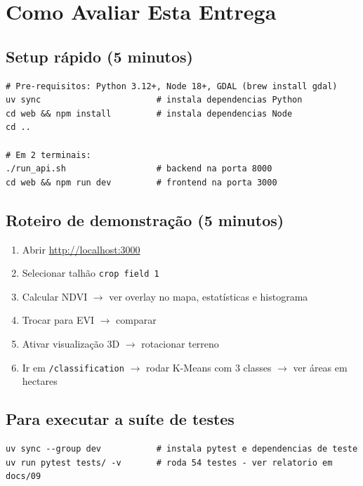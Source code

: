 \documentclass[11pt, a4paper]{article}
\begin{document}
\section{Como Avaliar Esta Entrega}

\subsection{Setup rápido (5 minutos)}

\begin{lstlisting}[style=shellstyle]
# Pre-requisitos: Python 3.12+, Node 18+, GDAL (brew install gdal)
uv sync                       # instala dependencias Python
cd web && npm install         # instala dependencias Node
cd ..

# Em 2 terminais:
./run_api.sh                  # backend na porta 8000
cd web && npm run dev         # frontend na porta 3000
\end{lstlisting}

\subsection{Roteiro de demonstração (5 minutos)}

\begin{enumerate}
  \item Abrir \url{http://localhost:3000}
  \item Selecionar talhão \texttt{crop field 1}
  \item Calcular NDVI \(\rightarrow\) ver overlay no mapa, estatísticas e histograma
  \item Trocar para EVI \(\rightarrow\) comparar
  \item Ativar visualização 3D \(\rightarrow\) rotacionar terreno
  \item Ir em \texttt{/classification} \(\rightarrow\) rodar K-Means com 3 classes \(\rightarrow\) ver áreas em hectares
\end{enumerate}

\subsection{Para executar a suíte de testes}

\begin{lstlisting}[style=shellstyle]
uv sync --group dev           # instala pytest e dependencias de teste
uv run pytest tests/ -v       # roda 54 testes - ver relatorio em docs/09
\end{lstlisting}
\end{document}

